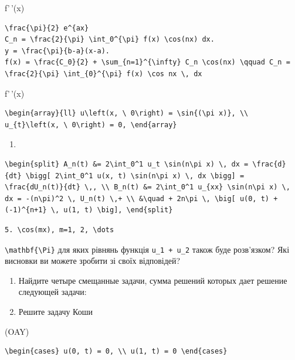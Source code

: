 \documentclass[
  ukrainian,
]{article}
\providecommand{\tightlist}{%
  \setlength{\itemsep}{0pt}\setlength{\parskip}{0pt}}
\begin{document}
f'\,'(x)

\begin{verbatim}
\frac{\pi}{2} e^{ax}
C_n = \frac{2}{\pi} \int_0^{\pi} f(x) \cos(nx) dx.
y = \frac{\pi}{b-a}(x-a).
f(x) = \frac{C_0}{2} + \sum_{n=1}^{\infty} C_n \cos(nx) \qquad C_n = \frac{2}{\pi} \int_{0}^{\pi} f(x) \cos nx \, dx
\end{verbatim}

f'\,'(x)

\begin{verbatim}
\begin{array}{ll} u\left(x, \ 0\right) = \sin{(\pi x)}, \\ u_{t}\left(x, \ 0\right) = 0, \end{array}
\end{verbatim}

\begin{enumerate}
\def\labelenumi{\alph{enumi})}
\tightlist
\item
\end{enumerate}

\begin{verbatim}
\begin{split} A_n(t) &= 2\int_0^1 u_t \sin(n\pi x) \, dx = \frac{d}{dt} \bigg[ 2\int_0^1 u(x, t) \sin(n\pi x) \, dx \bigg] = \frac{dU_n(t)}{dt} \,, \\ B_n(t) &= 2\int_0^1 u_{xx} \sin(n\pi x) \, dx = -(n\pi)^2 \, U_n(t) \,+ \\ &\quad + 2n\pi \, \big[ u(0, t) + (-1)^{n+1} \, u(1, t) \big], \end{split}
\end{verbatim}

\begin{verbatim}
5. \cos(mx), m=1, 2, \dots
\end{verbatim}

\texttt{\textbackslash{}mathbf\{\textbackslash{}Pi\}} для яких рівнянь
функція \texttt{u\_1\ +\ u\_2} також буде розв'язком? Які висновки ви
можете зробити зі своїх відповідей?

\begin{enumerate}
\def\labelenumi{\arabic{enumi}.}
\setcounter{enumi}{3}
\item
  Найдите четыре смещанные задачи, сумма решений которых дает решение
  следующей задачи:
\item
  Решите задачу Коши
\end{enumerate}

(OAY)

\begin{verbatim}
\begin{cases} u(0, t) = 0, \\ u(1, t) = 0 \end{cases}
\end{verbatim}
\end{document}
